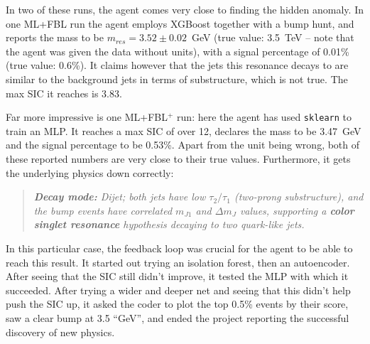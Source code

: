 \documentclass[submission, Phys]{SciPost}
\begin{document}
In two of these runs, the agent comes very close to finding the hidden anomaly. In one ML+FBL run the agent employs XGBoost together with a bump hunt, and reports the mass to be $m_{res}=3.52\pm0.02$~GeV (true value: 3.5~TeV -- note that the agent was given the data without units), with a signal percentage of 0.01\% (true value: 0.6\%). It claims however that the jets this resonance decays to are similar to the background jets in terms of substructure, which is not true. The max SIC it reaches is 3.83. 

Far more impressive is one ML+FBL$^+$ run: here the agent has used \verb|sklearn| to train an MLP. It reaches a max SIC of over 12, declares the mass to be 3.47~GeV and the signal percentage to be 0.53\%. Apart from the unit being wrong, both of these reported numbers are very close to their true values. Furthermore, it gets the underlying physics down correctly: 
\begin{quote}
    \textit{\textbf{Decay mode:} Dijet; both jets have low $\tau_2/\tau_1$ (two-prong substructure), and the bump events have correlated $m_{J1}$ and $\Delta m_J$ values, supporting a \textbf{color singlet resonance} hypothesis decaying to two quark-like jets.}
\end{quote}
In this particular case, the feedback loop was crucial for the agent to be able to reach this result. It started out trying an isolation forest, then an autoencoder. After seeing that the SIC still didn't improve, it tested the MLP with which it succeeded. After trying a wider and deeper net and seeing that this didn't help push the SIC up, it asked the coder to plot the top 0.5\% events by their score, saw a clear bump at 3.5 ``GeV'', and ended the project reporting the successful discovery of new physics.
\end{document}
